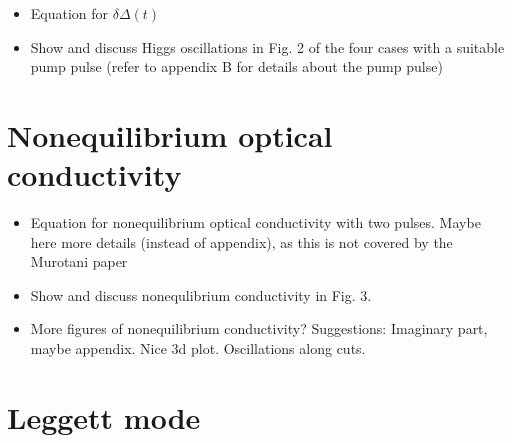 \documentclass[aps,prb,reprint,noeprint,superscriptaddress]{revtex4-1}
\begin{document}
\begin{itemize}
	\item Equation for $\delta\Delta(t)$
	\item Show and discuss Higgs oscillations in Fig. 2 of the four cases with a suitable pump pulse (refer to appendix B for details about the pump pulse)
\end{itemize}










\section{Nonequilibrium optical conductivity}
\label{sec:noneq_cond}

\begin{itemize}
	\item Equation for nonequilibrium optical conductivity with two pulses. Maybe here more details (instead of appendix), as this is not covered by the Murotani paper
	\item Show and discuss nonequlibrium conductivity in Fig. 3.
	\item More figures of nonequilibrium conductivity? Suggestions: Imaginary part, maybe appendix. Nice 3d plot. Oscillations along cuts.
\end{itemize}





\section{Leggett mode} 
\label{sec:leggett_mode}
\end{document}
